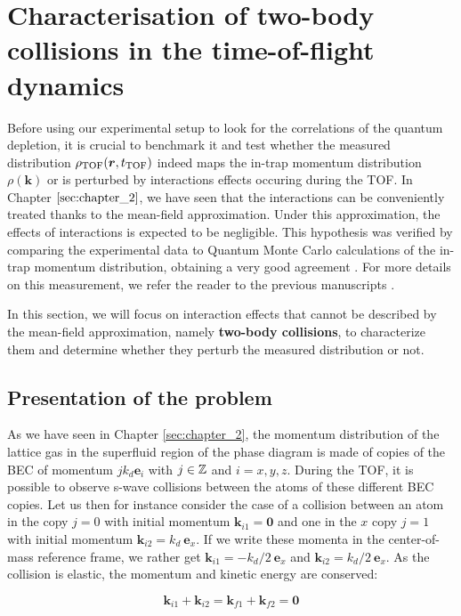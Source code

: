 \section{Characterisation of two-body collisions in the time-of-flight dynamics}

Before using our experimental setup to look for the \kmk correlations of the quantum depletion, it is crucial to benchmark it and test whether the measured distribution $\rho_{\rm{TOF}} (\bm{r},t_{\rm{TOF}})$ indeed maps the in-trap momentum distribution $\rho(\bm{k})$ or is perturbed by interactions effects occuring during the TOF. In Chapter $\ref{sec:chapter_2}$, we have seen that the interactions can be conveniently treated thanks to the mean-field approximation. Under this approximation, the effects of interactions is expected to be negligible. This hypothesis was verified by comparing the experimental data to Quantum Monte Carlo calculations of the in-trap momentum distribution, obtaining a very good agreement \cite{cayla2018single}. For more details on this measurement, we refer the reader to the previous manuscripts \cite{carcy_these,cayla_these}.

In this section, we will focus on interaction effects that cannot be described by the mean-field approximation, namely \textbf{two-body collisions}, to characterize them and determine whether they perturb the measured distribution or not.

\subsection{Presentation of the problem}

As we have seen in Chapter \ref{sec:chapter_2}, the momentum distribution of the lattice gas in the superfluid region of the phase diagram is made of copies of the BEC of momentum $j k_d \bm{e}_i$ with $j \in \mathbb{Z}$ and $i=x,y,z$. During the TOF, it is possible to observe s-wave collisions between the atoms of these different BEC copies. Let us then for instance consider the case of a collision between an atom in the copy $j=0$ with initial momentum $\bm{k}_{i1}=\bm{0}$ and one in the $x$ copy $j=1$ with initial momentum $\bm{k}_{i2}=k_d \ \bm{e}_x$. If we write these momenta in the center-of-mass reference frame, we rather get $\bm{k}_{i1}=-k_d/2 \ \bm{e}_x$ and $ \bm{k}_{i2}=k_d/2 \ \bm{e}_x$. As the collision is elastic, the momentum and kinetic energy are conserved:

\begin{equation}
    \bm{k}_{i1}+\bm{k}_{i2}=\bm{k}_{f1}+\bm{k}_{f2}=\bm{0}
\end{equation}

